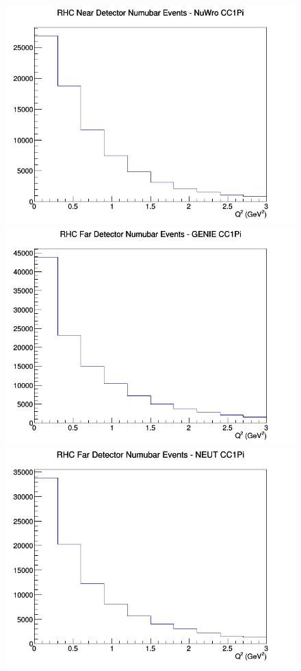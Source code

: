 \begin{figure}[h]
\includegraphics[width=\linewidth]{eff_Q2/FGT/CC1Pi_RHC_ND_numubar_Q2_NuWro.png}
\endminipage
\newline
{}
\includegraphics[width=\linewidth]{eff_Q2/FGT/CC1Pi_RHC_FD_numubar_Q2_GENIE.png}
\endminipage
{}
\includegraphics[width=\linewidth]{eff_Q2/FGT/CC1Pi_RHC_FD_numubar_Q2_NEUT.png}

\end{figure}
